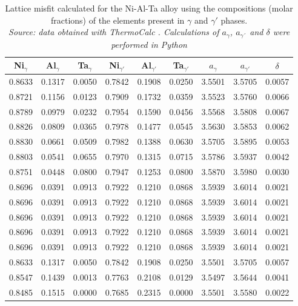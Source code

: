 \begin{table}[h]
    \centering
    \begin{tabular}{rrrrrrrrr}
        \multicolumn{1}{c}{Ni$_\gamma$} & \multicolumn{1}{c}{Al$_\gamma$} & \multicolumn{1}{c}{Ta$_\gamma$} & \multicolumn{1}{c}{Ni$_{\gamma'}$} & \multicolumn{1}{c}{Al$_{\gamma'}$} & \multicolumn{1}{c}{Ta$_{\gamma'}$} & \multicolumn{1}{c}{$a_\gamma$} & \multicolumn{1}{c}{$a_{\gamma'}$} & \multicolumn{1}{c}{$\delta$} \\ \hline \hline
        0.8633 & 0.1317 & 0.0050 & 0.7842 & 0.1908 & 0.0250 & 3.5501 & 3.5705 & 0.0057 \\0.8721 & 0.1156 & 0.0123 & 0.7909 & 0.1732 & 0.0359 & 3.5523 & 3.5760 & 0.0066 \\0.8789 & 0.0979 & 0.0232 & 0.7954 & 0.1590 & 0.0456 & 3.5568 & 3.5808 & 0.0067 \\0.8826 & 0.0809 & 0.0365 & 0.7978 & 0.1477 & 0.0545 & 3.5630 & 3.5853 & 0.0062 \\0.8830 & 0.0661 & 0.0509 & 0.7982 & 0.1388 & 0.0630 & 3.5705 & 3.5895 & 0.0053 \\0.8803 & 0.0541 & 0.0655 & 0.7970 & 0.1315 & 0.0715 & 3.5786 & 3.5937 & 0.0042 \\0.8751 & 0.0448 & 0.0800 & 0.7947 & 0.1253 & 0.0800 & 3.5870 & 3.5980 & 0.0030 \\0.8696 & 0.0391 & 0.0913 & 0.7922 & 0.1210 & 0.0868 & 3.5939 & 3.6014 & 0.0021 \\0.8696 & 0.0391 & 0.0913 & 0.7922 & 0.1210 & 0.0868 & 3.5939 & 3.6014 & 0.0021 \\0.8696 & 0.0391 & 0.0913 & 0.7922 & 0.1210 & 0.0868 & 3.5939 & 3.6014 & 0.0021 \\0.8696 & 0.0391 & 0.0913 & 0.7922 & 0.1210 & 0.0868 & 3.5939 & 3.6014 & 0.0021 \\0.8696 & 0.0391 & 0.0913 & 0.7922 & 0.1210 & 0.0868 & 3.5939 & 3.6014 & 0.0021 \\0.8633 & 0.1317 & 0.0050 & 0.7842 & 0.1908 & 0.0250 & 3.5501 & 3.5705 & 0.0057 \\0.8547 & 0.1439 & 0.0013 & 0.7763 & 0.2108 & 0.0129 & 3.5497 & 3.5644 & 0.0041 \\0.8485 & 0.1515 & 0.0000 & 0.7685 & 0.2315 & 0.0000 & 3.5501 & 3.5580 & 0.0022
    \end{tabular}
    \caption{\centering Lattice misfit calculated for the Ni-Al-Ta alloy using the compositions (molar fractions) of the elements present in $\gamma$ and $\gamma'$ phases. \\
    \textit{Source: data obtained with ThermoCalc \citep{thermocalc}. Calculations of $a_\gamma$, $a_{\gamma´}$ and $\delta$ were performed in Python \citep{mygit}}}
    \label{tab:tab03}
\end{table}

